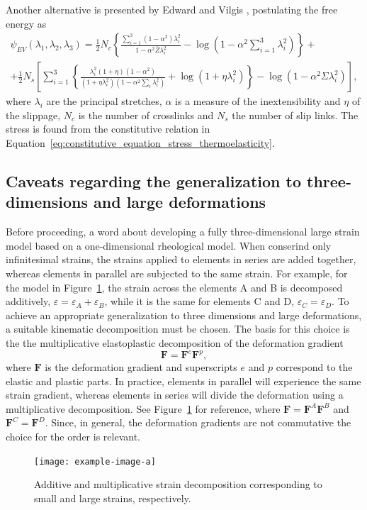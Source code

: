 Another alternative is presented by Edward and Vilgis \citep{edwardsEffectEntanglementsRubber1986}, postulating the free energy as
\begin{multline}
	\psi_{EV}(\lambda_1, \lambda_2, \lambda_3) = \frac{1}{2} N_c\left\{\frac{\sum_{i=1}^3\left(1-\alpha^2\right) \lambda_i^2}{1-\alpha^2 \bar{Z} \lambda_i^2}-\log \left(1-\alpha^2 \sum_{i=1}^3 \lambda_i^2\right)\right\}+ \\
	+\frac{1}{2} N_s\left[\sum_{i=1}^3\left\{\frac{\lambda_i^2(1+\eta)\left(1-\alpha^2\right)}{\left(1+\eta \lambda_i^2\right)\left(1-\alpha^2 \sum_i \lambda_i^2\right)}+\log \left(1+\eta \lambda_i^2\right)\right\}-\log \left(1-\alpha^2 \Sigma \lambda_i^2\right)\right],
\end{multline}
where $\lambda_i$ are the principal stretches, $\alpha$ is a measure of the inextensibility and $\eta$ of the slippage, $N_c$ is the number of crosslinks and $N_s$ the number of slip links.
The stress is found from the constitutive relation in Equation~\eqref{eq:constitutive_equation_stress_thermoelasticity}.

\subsection{Caveats regarding the generalization to three-dimensions and large deformations}
\label{sec:generalization_large_strains_3d}

Before proceeding, a word about developing a fully three-dimensional large strain model based on a one-dimensional rheological model.
When conserind only infinitesimal strains, the strains applied to elements in series are added together, whereas elements in parallel are subjected to the same strain.
For example, for the model in Figure~\ref{fig:gradient_decomp}, the strain across the elements A and B is decomposed additively, $\varepsilon = \varepsilon_A + \varepsilon_B$, while it is the same for elements C and D, $\varepsilon_C = \varepsilon_D$.
To achieve an appropriate generalization to three dimensions and large deformations, a suitable kinematic decomposition must be chosen.
The basis for this choice is the the multiplicative elastoplastic decomposition of the deformation gradient \citep{desouzanetoComputationalMethodsPlasticity2008}
\begin{equation}
	\label{eq:mult_gradient_decomp}
\mathbf F = \mathbf F^e \mathbf F^p,
\end{equation}
where $\mathbf F$ is the deformation gradient and superscripts $e$ and $p$ correspond to the elastic and plastic parts.
In practice, elements in parallel will experience the same strain gradient, whereas elements in series will divide the deformation using a multiplicative decomposition.
See Figure~\ref{fig:gradient_decomp} for reference, where $\mathbf F = \mathbf F^A \mathbf F^B$ and $\mathbf F^C = \mathbf F^D$.
Since, in general, the deformation gradients are not commutative the choice for the order is relevant.
\begin{figure}
	\centering
	\texttt{[image: example-image-a]}
	\caption{Additive and multiplicative strain decomposition corresponding to small and large strains, respectively.}
\label{fig:gradient_decomp}
\end{figure}

